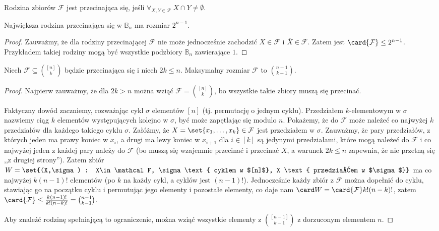\begin{definition}
	Rodzina zbiorów $\mathcal F$ jest przecinająca się, jeśli $\forall_{X, Y\in \mathcal F} \ X \cap Y \neq \emptyset$.
\end{definition}

\begin{theorem}
	Największa rodzina przecinająca się w $\mathbb B_n$ ma rozmiar $2^{n-1}$.
\end{theorem}
\begin{proof}
	Zauważmy, że dla rodziny przecinającej $\mathcal F$ nie może jednocześnie
	zachodzić $X\in\mathcal F$ i $\overline X\in\mathcal F$. Zatem jest
	$\card{\mathcal F}\le 2^{n-1}$. Przykładem takiej rodziny mogą być wszystkie
	podzbiory $\mathbb B_n$ zawierające $1$.
\end{proof}

\begin{theorem}
	Niech $\mathcal F\subseteq \binom{[n]}{k}$ będzie przecinająca się i niech
	$2k\le n$. Maksymalny rozmiar $\mathcal F$ to $\binom{n-1}{k-1}$.
\end{theorem}
\begin{proof}
	Najpierw zauważmy, że dla $2k>n$ można wziąć $\mathcal F = \binom{[n]}{k}$, bo
	wszystkie takie zbiory muszą się przecinać.

	Faktyczny dowód zaczniemy, rozważając cykl $\sigma$ elementów
	$[n]$ (tj. permutację o jednym cyklu). Przedziałem $k$-elementowym w $\sigma$
	nazwiemy ciąg $k$ elementów występujących kolejno w $\sigma$, być może zapętlając
	się modulo $n$. Pokażemy, że do $\mathcal F$ może należeć co najwyżej $k$
	przedziałów dla każdego takiego cyklu $\sigma$.
	Załóżmy, że $X=\set{x_1,\ldots,x_k}\in\mathcal
		F$ jest przedziałem w $\sigma.$ Zauważmy, że pary przedziałów, z których
	jeden ma prawy koniec w $x_i$, a drugi ma lewy koniec w $x_{i+1}$ dla $i\in
		[k]$ są jedynymi przedziałami, które mogą należeć do $\mathcal F$ i co
	najwyżej jeden z każdej pary należy do $\mathcal F$ (bo muszą się wzajemnie
	przecinać i przecinać $X$, a warunek $2k\le n$ zapewnia, że
	nie przetną się ,,z drugiej strony''). Zatem zbiór
	$W = \set{(X,\sigma) : X\in\mathcal F, \sigma \text{ cyklem w $[n]$}, X \text{ przedziałem w
				$\sigma$}}$ ma co najwyżej $k(n-1)!$ elementów (po $k$ na każdy cykl, a cyklów jest $(n-1)!$).
	Jednocześnie każdy zbiór z $\mathcal F$ można dopełnić do cyklu, stawiając go
	na początku cyklu i permutując jego elementy i pozostałe elementy, co daje nam
	$\card W = \card{\mathcal F}k!(n-k)!$, zatem $\card{\mathcal F} \le
		\frac{k(n-1)!}{k!(n-k)!} = \binom{n-1}{k-1}$.

	Aby znaleźć rodzinę spełniającą to ograniczenie, można wziąć wszystkie elementy z
	$\displaystyle\binom{[n-1]}{k-1}$ z dorzuconym elementem $n$.
\end{proof}

